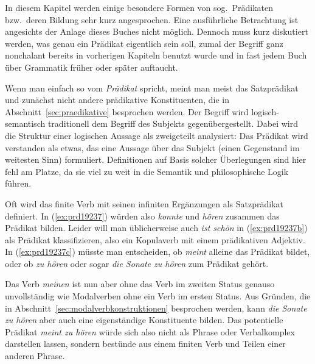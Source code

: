 In diesem Kapitel werden einige besondere Formen von sog.\ Prädikaten bzw.\ deren Bildung sehr kurz angesprochen.
Eine ausführliche Betrachtung ist angesichts der Anlage dieses Buches nicht möglich.
Dennoch muss kurz diskutiert werden, was genau ein Prädikat eigentlich sein soll, zumal der Begriff ganz nonchalant bereits in vorherigen Kapiteln benutzt wurde und in fast jedem Buch über Grammatik früher oder später auftaucht.


Wenn man einfach so vom \textit{Prädikat} spricht, meint man meist das Satzprädikat und zunächst nicht andere prädikative Konstituenten, die in Abschnitt~\ref{sec:praedikative} besprochen werden.
Der Begriff wird logisch-semantisch traditionell dem Begriff des Subjekts gegenübergestellt.
Dabei wird die Struktur einer logischen Aussage als zweigeteilt analysiert:
Das Prädikat wird verstanden als etwas, das eine Aussage über das Subjekt (einen Gegenstand im weitesten Sinn) formuliert.
Definitionen auf Basis solcher Überlegungen sind hier fehl am Platze, da sie viel zu weit in die Semantik und philosophische Logik führen.

Oft wird das finite Verb mit seinen infiniten Ergänzungen als Satzprädikat definiert.
In (\ref{ex:prd19237}) würden also \textit{konnte} und \textit{hören} zusammen das Prädikat bilden.
Leider will man üblicherweise auch \textit{ist schön} in (\ref{ex:prd19237b}) als Prädikat klassifizieren, also ein Kopulaverb mit einem prädikativen Adjektiv.
In (\ref{ex:prd19237c}) müsste man entscheiden, ob \textit{meint} alleine das Prädikat bildet, oder ob \textit{zu hören} oder sogar \textit{die Sonate zu hören} zum Prädikat gehört.

\begin{exe}
  \ex\label{ex:prd19237} 
  \begin{xlist}
  \end{xlist}
\end{exe}

Das Verb \textit{meinen} ist nun aber ohne das Verb im zweiten Status genauso unvollständig wie Modalverben ohne ein Verb im ersten Status.
Aus Gründen, die in Abschnitt~\ref{sec:modalverbkonstruktionen} besprochen werden, kann \textit{die Sonate zu hören} aber auch eine eigenständige Konstituente bilden.
Das potentielle Prädikat \textit{meint zu hören} würde sich also nicht als Phrase oder Verbalkomplex darstellen lassen, sondern bestünde aus einem finiten Verb und Teilen einer anderen Phrase.

